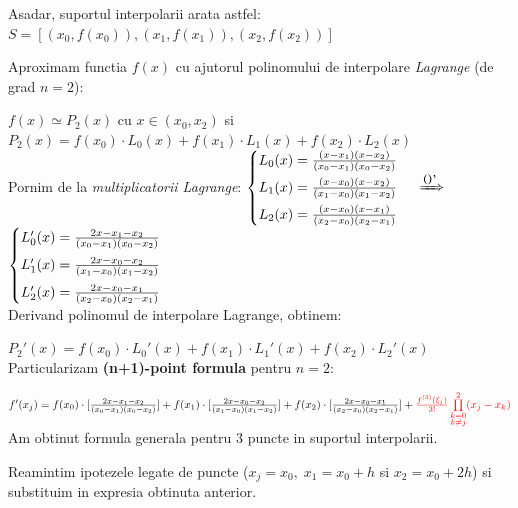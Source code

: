 \documentclass{article}
\begin{document}
Asadar, suportul interpolarii arata astfel:
$S = [(x_0, f(x_0)), (x_1, f(x_1)), (x_2, f(x_2))]$

Aproximam functia $f(x)$ cu ajutorul polinomului de interpolare \textit{Lagrange} (de grad $n=2$):

$f(x) \simeq P_2(x)$ cu $x \in (x_0, x_2)$ si
$P_2(x) = f(x_0) \cdot L_0(x) + f(x_1) \cdot L_1(x) + f(x_2) \cdot L_2(x)$ \\

Pornim de la \textit{multiplicatorii Lagrange}:
$\begin{cases}
    L_0(x) = \frac{(x-x_1)(x-x_2)}{(x_0-x_1)(x_0-x_2)} \vspace{0.15cm}\\
    L_1(x) = \frac{(x-x_0)(x-x_2)}{(x_1-x_0)(x_1-x_2)} \vspace{0.15cm}\\
    L_2(x) = \frac{(x-x_0)(x-x_1)}{(x_2-x_0)(x_2-x_1)} \\
\end{cases}$
$\xRightarrow[]{\textbf{()'}}$
$\begin{cases}
    L_0'(x) = \frac{2x-x_1-x_2}{(x_0-x_1)(x_0-x_2)} \vspace{0.15cm}\\
    L_1'(x) = \frac{2x-x_0-x_2}{(x_1-x_0)(x_1-x_2)} \vspace{0.15cm}\\
    L_2'(x) = \frac{2x-x_0-x_1}{(x_2-x_0)(x_2-x_1)} \\
\end{cases}$\\

Derivand polinomul de interpolare Lagrange, obtinem:

$P_2'(x) = f(x_0) \cdot L_0'(x) + f(x_1) \cdot L_1'(x) + f(x_2) \cdot L_2'(x)$\\

Particularizam \textbf{(n+1)-point formula} pentru $n=2$:

$f'(x_j) = f(x_0) \cdot [\frac{2x-x_1-x_2}{(x_0-x_1)(x_0-x_2)}] + f(x_1) \cdot [\frac{2x-x_0-x_2}{(x_1-x_0)(x_1-x_2)}] + f(x_2) \cdot [\frac{2x-x_0-x_1}{(x_2-x_0)(x_2-x_1)}] + \textcolor{red}{\frac{f^{(3)}(\xi_j)}{3!} \prod\limits_{\substack{k=0 \\ k \neq j}}^{2} (x_j-x_k)}$\\

Am obtinut formula generala pentru $3$ puncte in suportul interpolarii.

Reamintim ipotezele legate de puncte ($x_j=x_0,\; x_1=x_0+h$ si $x_2=x_0+2h$) si substituim in expresia obtinuta anterior.
\\
\end{document}

